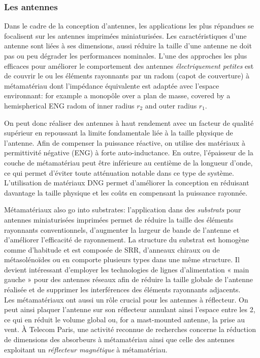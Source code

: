 \subsubsection{Les antennes}

Dans le cadre de la conception d'antennes, les applications les plus répandues
se focalisent sur les antennes imprimées miniaturisées. Les caractéristiques
d'une antenne sont liées à ses dimensions, aussi réduire la taille d'une
antenne ne doit pas ou peu dégrader les performances nominales. L'une des
approches les plus efficaces pour améliorer le comportement des antennes
\emph{électriquement petites} est de couvrir le ou les éléments rayonnants par
un radom (capot de couverture) à métamatériau dont l'impédance équivalente est
adaptée avec l'espace environnant: for example a monopôle over a plan de masse,
covered by a hemispherical ENG radom of inner radius $r_2$ and outer radius
$r_1$.

\begin{conclusion}
  On peut donc réaliser des antennes à haut rendement avec un facteur de
  qualité supérieur en repoussant la limite fondamentale liée à la taille
  physique de l'antenne. Afin de compenser la puissance réactive, on utilise des
  matériaux à permittivité négative (ENG) à forte auto-inductance. En outre,
  l'épaisseur de la couche de métamatériau peut être inférieure au centième de
  la longueur d'onde, ce qui permet d'éviter toute atténuation notable dans ce
  type de système. L'utilisation de matériaux DNG permet d'améliorer la
  conception en réduisant davantage la taille physique et les coûts en
  compensant la puissance rayonnée.
\end{conclusion}

Métamatériaux also go into substrates: l'application dans des \emph{substrats}
pour antennes miniaturisées imprimées permet de réduire la taille des éléments
rayonnants conventionnels, d'augmenter la largeur de bande de l'antenne et
d'améliorer l'efficacité de rayonnement. La structure du substrat est homogène
comme d'habitude et est composée de SRR, d'anneaux chiraux ou de
métasolénoïdes ou en comporte plusieurs types dans une même structure. Il
devient intéressant d'employer les technologies de lignes d'alimentation
« main gauche » pour des antennes réseaux afin de réduire la taille globale de
l'antenne réalisée et de supprimer les interférences des éléments rayonnants
adjacents.\\

Les métamatériaux ont aussi un rôle crucial pour les antennes à réflecteur. On
peut ainsi plaquer l'antenne sur son réflecteur annulant ainsi l'espace entre
les 2, ce qui en réduit le volume global ou, for a mast-mounted antenne, la
prise au vent. À Telecom Paris, une activité reconnue de recherches concerne la
réduction de dimensions des absorbeurs à métamatériau ainsi que celle des
antennes exploitant un \emph{réflecteur magnétique} à métamatériau.

